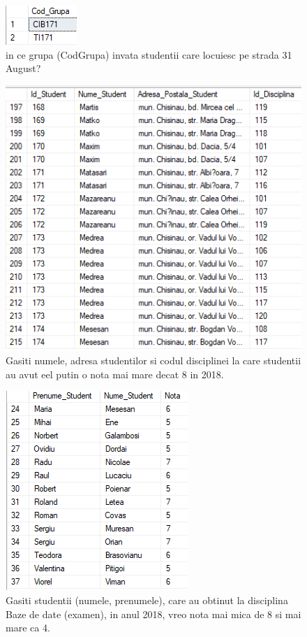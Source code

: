 \documentclass[12pt]{article}
\begin{document}
        \begin{figure}[H]
                \centering
                \includegraphics[width=.25\textwidth]{img7.png}
                \caption{in ce grupa (CodGrupa) invata studentii care locuiesc pe strada 31 August?  }
        \end{figure}
        \vspace{0.5 cm}

        \begin{figure}[H]
                \centering
                \includegraphics[width=.9\textwidth]{img9.png}
                \caption{Gasiti numele, adresa studentilor si codul disciplinei la care studentii au avut eel putin o nota mai mare decat 8 in 2018.}
        \end{figure}
        \vspace{0.5 cm}

        \begin{figure}[H]
                \centering
                \includegraphics[width=.55\textwidth]{img10.png}
                \caption{Gasiti studentii (numele, prenumele), care au obtinut la disciplina Baze de date (examen), in anul 2018, vreo nota mai mica de 8 si mai mare ca 4.}
        \end{figure}
        \vspace{0.5 cm}
\end{document}
